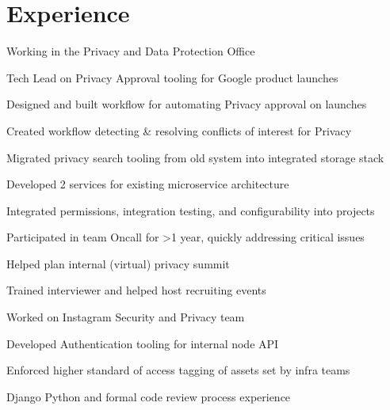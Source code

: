 \documentclass[]{deedy-resume-openfont}
\begin{document}
\begin{minipage}[t]{0.66\textwidth}


\section{Experience}

\vspace{\topsep} %
\begin{tightemize}
\item Working in the Privacy and Data Protection Office
\item Tech Lead on Privacy Approval tooling for Google product launches
\item Designed and built workflow for automating Privacy approval on  launches
\item Created workflow detecting \& resolving conflicts of interest for Privacy
\item Migrated privacy search tooling from old system into integrated storage stack
\item Developed 2 services for existing microservice architecture
\item Integrated permissions, integration testing, and configurability into projects
\item Participated in team Oncall for >1 year, quickly addressing critical issues
\item Helped plan internal (virtual) privacy summit
\item Trained interviewer and helped host recruiting events
\end{tightemize}
\sectionsep

\begin{tightemize}
\item Worked on Instagram Security and Privacy team
\item Developed Authentication tooling for internal node API
\item Enforced higher standard of access tagging of assets set by infra teams
\item Django Python and formal code review process experience
\end{tightemize}
\sectionsep


\end{minipage}
\end{document}
